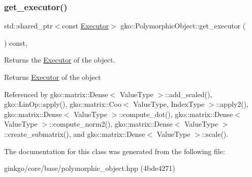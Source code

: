 \subsubsection{\texorpdfstring{get\+\_\+executor()}{get\_executor()}}
{\footnotesize\ttfamily std\+::shared\+\_\+ptr$<$const \hyperlink{classgko_1_1Executor}{Executor}$>$ gko\+::\+Polymorphic\+Object\+::get\+\_\+executor (\begin{DoxyParamCaption}{ }\end{DoxyParamCaption}) const\hspace{0.3cm}{\ttfamily [inline]}, {\ttfamily [noexcept]}}



Returns the \hyperlink{classgko_1_1Executor}{Executor} of the object. 

\begin{DoxyReturn}{Returns}
\hyperlink{classgko_1_1Executor}{Executor} of the object 
\end{DoxyReturn}


Referenced by gko\+::matrix\+::\+Dense$<$ Value\+Type $>$\+::add\+\_\+scaled(), gko\+::\+Lin\+Op\+::apply(), gko\+::matrix\+::\+Coo$<$ Value\+Type, Index\+Type $>$\+::apply2(), gko\+::matrix\+::\+Dense$<$ Value\+Type $>$\+::compute\+\_\+dot(), gko\+::matrix\+::\+Dense$<$ Value\+Type $>$\+::compute\+\_\+norm2(), gko\+::matrix\+::\+Dense$<$ Value\+Type $>$\+::create\+\_\+submatrix(), and gko\+::matrix\+::\+Dense$<$ Value\+Type $>$\+::scale().



The documentation for this class was generated from the following file\+:\begin{DoxyCompactItemize}
\item 
ginkgo/core/base/polymorphic\+\_\+object.\+hpp (4bde4271)\end{DoxyCompactItemize}
